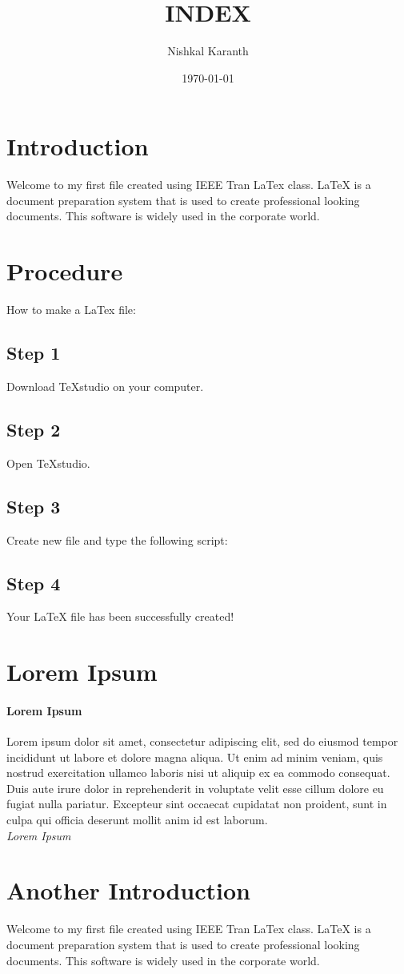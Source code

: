 \documentclass[a4paper,12pt]{IEEEtran}
\begin{document}
      \title{INDEX}
      \maketitle
      \tableofcontents
      \newpage
      \author{Nishkal Karanth}
      \date{\today}
      \section{Introduction}
      Welcome to my first file created using IEEE Tran LaTex class. LaTeX is a document preparation system that is used to create professional looking documents. This software is widely used in the corporate world.
      \section{Procedure}
      How to make a LaTex file:
      \subsection{Step 1}
      Download TeXstudio on your computer.
      \subsection{Step 2}
      Open TeXstudio.
      \subsection{Step 3}
      Create new file and type the following script:
      \subsection{Step 4}
      Your LaTeX file has been successfully created!
        \section{Lorem Ipsum}
        \paragraph{Lorem Ipsum \\}
         Lorem ipsum dolor sit amet, consectetur adipiscing elit, sed do eiusmod tempor incididunt ut labore et dolore magna aliqua. Ut enim ad minim veniam, quis nostrud exercitation ullamco laboris nisi ut aliquip ex ea commodo consequat. Duis aute irure dolor in reprehenderit in voluptate velit esse cillum dolore eu fugiat nulla pariatur. Excepteur sint occaecat cupidatat non proident, sunt in culpa qui officia deserunt mollit anim id est laborum. \\
        \textit{Lorem Ipsum}
        \section{Another Introduction}
        Welcome to my first file created using IEEE Tran LaTex class. LaTeX is a document preparation system that is used to create professional looking documents. This software is widely used in the corporate world.
        
     
\end{document}
